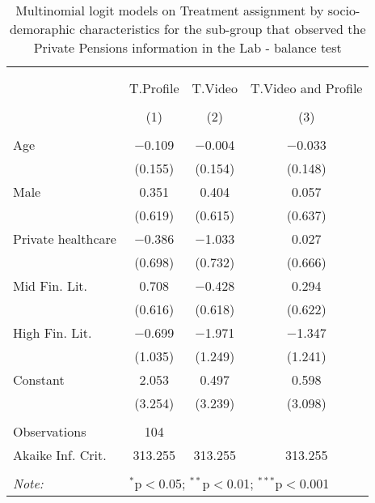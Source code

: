 
\begin{table}[H] \centering 
  \caption{Multinomial logit models on Treatment assignment by socio-demoraphic characteristics for the sub-group that observed the Private Pensions information in the Lab  - balance test} 
  \label{tbl:balance_private_lab} 
\begin{tabular}{@{\extracolsep{5pt}}lccc} 
\\[-1.8ex]\hline 
\hline \\[-1.8ex] 
\\[-1.8ex] & T.Profile & T.Video & T.Video and Profile \\ 
\\[-1.8ex] & (1) & (2) & (3)\\ 
\hline \\[-1.8ex] 
 Age & $-$0.109 & $-$0.004 & $-$0.033 \\ 
  & (0.155) & (0.154) & (0.148) \\ 
  Male & 0.351 & 0.404 & 0.057 \\ 
  & (0.619) & (0.615) & (0.637) \\ 
  Private healthcare & $-$0.386 & $-$1.033 & 0.027 \\ 
  & (0.698) & (0.732) & (0.666) \\ 
  Mid Fin. Lit. & 0.708 & $-$0.428 & 0.294 \\ 
  & (0.616) & (0.618) & (0.622) \\ 
  High Fin. Lit. & $-$0.699 & $-$1.971 & $-$1.347 \\ 
  & (1.035) & (1.249) & (1.241) \\ 
  Constant & 2.053 & 0.497 & 0.598 \\ 
  & (3.254) & (3.239) & (3.098) \\ 
 \hline \\[-1.8ex] 
Observations & 104 &  &  \\ 
Akaike Inf. Crit. & 313.255 & 313.255 & 313.255 \\ 
\hline 
\hline \\[-1.8ex] 
\textit{Note:}  & \multicolumn{3}{l}{$^{*}$p$<$0.05; $^{**}$p$<$0.01; $^{***}$p$<$0.001} \\ 
\end{tabular} 
\end{table} 

